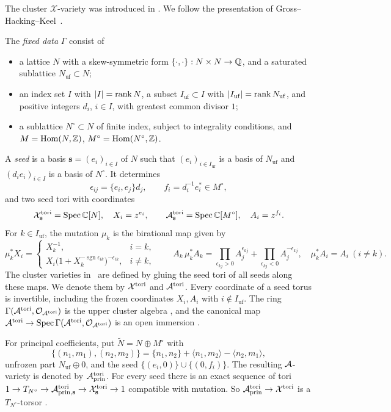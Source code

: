 \documentclass[12pt, letter]{amsart}
\theoremstyle{definition}
\begin{document}
The cluster $\mathcal X$-variety was introduced in \cite{FG09}.  We follow the presentation of  Gross--Hacking--Keel~\cite[Section~2]{GHK}.


The \emph{fixed data} $\Gamma$ consist of
\begin{itemize}
\item a lattice $N$ with a skew-symmetric form $\{\cdot,\cdot\}:N\times N\to\mathbb{Q}$, and a saturated sublattice $N_{\mathrm{uf}}\subset N$;
\item an index set $I$ with $|I|=\operatorname{rank} N$, a subset $I_{\mathrm{uf}}\subset I$ with $|I_{\mathrm{uf}}|=\operatorname{rank} N_{\mathrm{uf}}$, and positive integers $d_i$, $i\in I$, with greatest common divisor $1$;
\item a sublattice $N^\circ\subset N$ of finite index, subject to integrality conditions, and $M=\operatorname{Hom}(N,\mathbb{Z})$, $M^\circ=\operatorname{Hom}(N^\circ,\mathbb{Z})$.
\end{itemize}
A \emph{seed} is a basis $\mathbf s=(e_i)_{i\in I}$ of $N$ such that $(e_i)_{i\in I_{\mathrm{uf}}}$ is a basis of $N_{\mathrm{uf}}$ and $(d_ie_i)_{i\in I}$ is a basis of $N^\circ$.
It determines
\[
 \epsilon_{ij}=\{e_i,e_j\}d_j,\qquad f_i=d_i^{-1}e_i^*\in M^\circ,
\]
and two seed tori with coordinates
\[
 \mathcal{X}^{\mathrm{tori}}_{\mathbf s}=\operatorname{Spec}\mathbb{C}[N],\quad X_i=z^{e_i},\qquad
 \mathcal{A}^{\mathrm{tori}}_{\mathbf s}=\operatorname{Spec}\mathbb{C}[M^\circ],\quad A_i=z^{f_i}.
\]
For $k\in I_{\mathrm{uf}}$, the mutation $\mu_k$ is the birational map given by \cite[(2.7), (2.8)]{GHK}
\[
 \mu_k^*X_i=\begin{cases}X_k^{-1},&i=k,\\ X_i\bigl(1+X_k^{-\operatorname{sgn}\epsilon_{ik}}\bigr)^{-\epsilon_{ik}},&i\ne k,\end{cases}
 \qquad
 A_k\,\mu_k^*A_k=\prod_{\epsilon_{kj}>0}A_j^{\epsilon_{kj}}+\prod_{\epsilon_{kj}<0}A_j^{-\epsilon_{kj}},\quad \mu_k^*A_i=A_i\ (i\ne k).
\]
The cluster varieties in~\cite{GHK} are defined by gluing the seed tori of all seeds along these maps.
We denote them by  $\mathcal{X}^{\mathrm{tori}}$ and $\mathcal{A}^{\mathrm{tori}}$. 
Every coordinate of a seed torus is invertible, including the frozen coordinates $X_i,A_i$ with $i\notin I_{\mathrm{uf}}$.
The ring $\Gamma(\mathcal{A}^{\mathrm{tori}},\mathcal{O}_{\mathcal{A}^{\mathrm{tori}}})$ is the upper cluster algebra \cite[Definition~2.8, Remark~2.9]{GHK}, and the canonical map $\mathcal{A}^{\mathrm{tori}}\to\operatorname{Spec}\Gamma(\mathcal{A}^{\mathrm{tori}},\mathcal{O}_{\mathcal{A}^{\mathrm{tori}}})$ is an open immersion \cite[Theorem~3.14]{GHK}. 

For principal coefficients, put $\widetilde N=N\oplus M^\circ$ with
\[
 \{(n_1,m_1),(n_2,m_2)\}=\{n_1,n_2\}+\langle n_1,m_2\rangle-\langle n_2,m_1\rangle,
\]
unfrozen part $N_{\mathrm{uf}}\oplus0$, and the seed $\{(e_i,0)\}\cup\{(0,f_i)\}$.
The resulting $\mathcal{A}$-variety is denoted by $\mathcal{A}^{\mathrm{tori}}_{\mathrm{prin}}$.
For every seed there is an exact sequence of tori $1\to T_{N^\circ}\to\mathcal{A}^{\mathrm{tori}}_{\mathrm{prin},\mathbf s}\to\mathcal{X}^{\mathrm{tori}}_{\mathbf s}\to1$ compatible with mutation.
So $\mathcal{A}^{\mathrm{tori}}_{\mathrm{prin}}\to\mathcal{X}^{\mathrm{tori}}$ is a $T_{N^\circ}$-torsor \cite[Construction~2.11]{GHK}.
\end{document}
